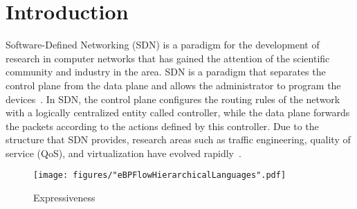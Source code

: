 \section{Introduction}
\label{sec:intro}

Software-Defined Networking (SDN) is a paradigm for the development of research in computer networks that has gained the attention of the scientific community and industry in the area. SDN is a paradigm that separates the control plane from the data plane and allows the administrator to program the devices~\cite{ProgrammableNetworks2015}. In SDN, the control plane configures the routing rules of the network with a logically centralized entity called controller, while the data plane forwards the packets according to the actions defined by this controller. Due to the structure that SDN provides, research areas such as traffic engineering, quality of service (QoS), and virtualization have evolved rapidly~\cite{stubbe2017p4}.


 

\begin{figure}[!htp]
\centering
\texttt{[image: figures/"eBPFlowHierarchicalLanguages".pdf]}
\caption{Expressiveness}
\label{fig:Language}
\end{figure}

